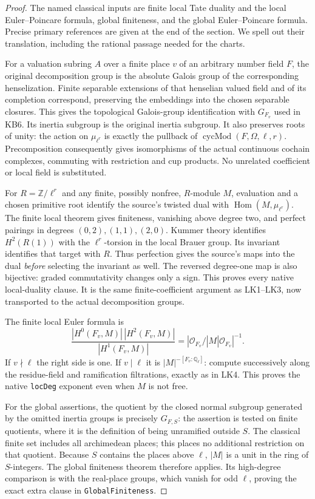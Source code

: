 \begin{proof}
The named classical inputs are finite local Tate duality and the
local Euler--Poincare formula, global finiteness, and the global
Euler--Poincare formula.  Precise primary references are given
at the end of the section.  We spell out their translation,
including the rational passage needed for the charts.

For a valuation subring $A$ over a finite place $v$ of an arbitrary
number field $F$, the original decomposition group is the absolute
Galois group of the corresponding henselization.  Finite separable
extensions of that henselian valued field and of its completion
correspond, preserving the embeddings into the chosen separable
closures.  This gives the topological Galois-group identification
with $G_{F_v}$ used in KB6.  Its inertia subgroup is the original
inertia subgroup.  It also preserves roots of unity: the action
on $\mu_{\ell^r}$ is exactly the pullback of
$\operatorname{cycMod}(F,\Omega,\ell,r)$.
Precomposition consequently gives isomorphisms of the actual
continuous cochain complexes, commuting with restriction and cup
products.  No unrelated coefficient or local field is substituted.

For $R=\mathbb Z/\ell^r$ and any finite, possibly nonfree, $R$-module
$M$, evaluation and a chosen primitive root identify the source's
twisted dual with $\operatorname{Hom}(M,\mu_{\ell^r})$.
The finite local theorem gives finiteness, vanishing above degree
two, and perfect pairings in degrees $(0,2),(1,1),(2,0)$.
Kummer theory identifies $H^2(R(1))$ with the $\ell^r$-torsion
in the local Brauer group.  Its invariant identifies that target
with $R$.  Thus perfection gives the source's maps into the
dual \emph{before} selecting the invariant as well.  The reversed
degree-one map is also bijective: graded commutativity changes
only a sign.  This proves every native local-duality clause.
It is the same finite-coefficient argument as LK1--LK3,
now transported to the actual decomposition groups.

The finite local Euler formula is
\[
 \frac{|H^0(F_v,M)|\,|H^2(F_v,M)|}{|H^1(F_v,M)|}
                   =|\mathcal O_{F_v}/|M|\mathcal O_{F_v}|^{-1}.
 \tag{DX.8}
\]
If $v\nmid\ell$ the right side is one.
If $v\mid\ell$ it is $|M|^{-[F_v:\mathbb Q_\ell]}$:
compute successively along the residue-field and ramification
filtrations, exactly as in LK4.  This proves the native
\texttt{locDeg} exponent even when $M$ is not free.

For the global assertions, the quotient by the closed normal
subgroup generated by the omitted inertia groups is precisely
$G_{F,S}$: the assertion is tested on finite quotients, where it
is the definition of being unramified outside $S$.
The classical finite set includes all archimedean places; this
places no additional restriction on that quotient.
Because $S$ contains the places above $\ell$, $|M|$ is a unit
in the ring of $S$-integers.
The global finiteness theorem therefore applies.  Its
high-degree comparison is with the real-place groups, which
vanish for odd $\ell$, proving the exact extra clause in
\texttt{GlobalFiniteness}.


\end{proof}
